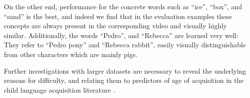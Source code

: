 On the other end, performance for the concrete words such as ``ice'', ``box'', 
and ``sand'' is the best, and indeed we find that in the evaluation examples 
these concepts are always present in the corresponding video and visually 
highly similar. Additionally, the words ``Pedro'', and ``Rebecca'' 
are learned very well: They refer to ``Pedro pony'' and ``Rebecca rabbit'', 
easily visually distinguishable from other characters which are mainly pigs.

Further investigations with larger datasets are necessary to reveal the 
underlying reasons for difficulty, and relating them to predictors of age of 
acquisition in the child language acquisition literature 
\cite{roy2015predicting,frank2021variability}. 


